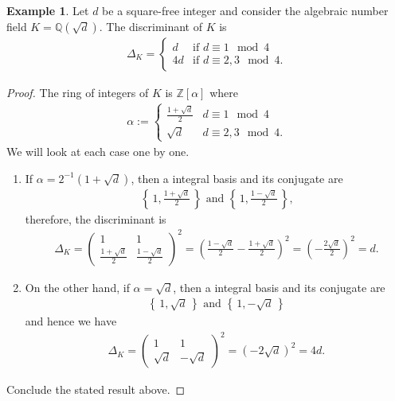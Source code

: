\documentclass[a4paper]{book}
\theoremstyle{definition}
\newtheorem{example}{Example}[definition]
\newcommand{\set}[1]{\left\{\, #1 \,\right\}}
\begin{document}
\begin{example}
    Let \(d\) be a square-free integer and consider the algebraic number field \(K = \mathbb{Q}(\sqrt{d})\). The discriminant of \(K\) is
    \begin{align*}
        \Delta_K = \begin{cases}
            d & \text{if \(d \equiv 1 \mod{4}\)}\\
            4d & \text{if \(d \equiv 2, 3 \mod{4}\).}
        \end{cases}
    \end{align*}
\end{example}
\begin{proof}
    The ring of integers of \(K\) is \(\mathbb{Z}[\alpha]\) where
    \begin{align*}
        \alpha := \begin{cases}
            \frac{1 + \sqrt{d}}{2} & d \equiv 1 \mod{4} \\
            \sqrt{d} & d \equiv 2, 3 \mod{4} \text{.}
        \end{cases}
    \end{align*}
    We will look at each case one by one.
    \begin{enumerate}
        \item If \(\alpha = 2^{-1}(1 + \sqrt{d})\), then a integral basis and its conjugate are
        \begin{align*}
            \set{1, \frac{1 + \sqrt{d}}{2}} \text{ and } \set{1, \frac{1 - \sqrt{d}}{2}} \text{,}
        \end{align*}
        therefore, the discriminant is
        \begin{align*}
            \Delta_K = \begin{pmatrix}
                1 & 1 \\
                \frac{1 + \sqrt{d}}{2} & \frac{1 - \sqrt{d}}{2}
            \end{pmatrix}^2
            = \left(\frac{1 - \sqrt{d}}{2} - \frac{1 + \sqrt{d}}{2}\right)^2
            = \left(-\frac{2 \sqrt{d}}{2}\right)^2 = d \text{.}
        \end{align*}
        \item On the other hand, if \(\alpha = \sqrt{d}\), then a integral basis and its conjugate are
        \begin{align*}
            \set{1, \sqrt{d}} \text{ and } \set{1, -\sqrt{d}}
        \end{align*}
        and hence we have
        \begin{align*}
            \Delta_K = \begin{pmatrix}
                1 & 1 \\
                \sqrt{d} & -\sqrt{d}
            \end{pmatrix}^2
            = \left(-2\sqrt{d}\right)^2 = 4d \text{.}
        \end{align*}
    \end{enumerate}
    Conclude the stated result above.
\end{proof}
\end{document}
